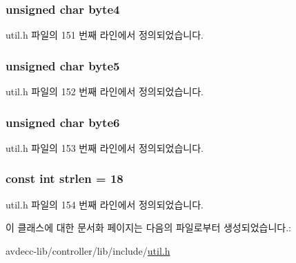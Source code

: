 \subsubsection[{\texorpdfstring{byte4}{byte4}}]{\setlength{\rightskip}{0pt plus 5cm}unsigned char byte4}\hypertarget{classavdecc__lib_1_1utility_1_1_mac_addr_a3504163365168f3068a2e1b24046a092}{}\label{classavdecc__lib_1_1utility_1_1_mac_addr_a3504163365168f3068a2e1b24046a092}


util.\+h 파일의 151 번째 라인에서 정의되었습니다.

\subsubsection[{\texorpdfstring{byte5}{byte5}}]{\setlength{\rightskip}{0pt plus 5cm}unsigned char byte5}\hypertarget{classavdecc__lib_1_1utility_1_1_mac_addr_aef954e72df4ca73d389e3758de6fe4d4}{}\label{classavdecc__lib_1_1utility_1_1_mac_addr_aef954e72df4ca73d389e3758de6fe4d4}


util.\+h 파일의 152 번째 라인에서 정의되었습니다.

\subsubsection[{\texorpdfstring{byte6}{byte6}}]{\setlength{\rightskip}{0pt plus 5cm}unsigned char byte6}\hypertarget{classavdecc__lib_1_1utility_1_1_mac_addr_a7d7a4667cf60a38b8282da8a27346f54}{}\label{classavdecc__lib_1_1utility_1_1_mac_addr_a7d7a4667cf60a38b8282da8a27346f54}


util.\+h 파일의 153 번째 라인에서 정의되었습니다.

\subsubsection[{\texorpdfstring{strlen}{strlen}}]{\setlength{\rightskip}{0pt plus 5cm}const int strlen = 18\hspace{0.3cm}{\ttfamily [static]}}\hypertarget{classavdecc__lib_1_1utility_1_1_mac_addr_ac15b51e8be042e8e8d1cbc7077cf411b}{}\label{classavdecc__lib_1_1utility_1_1_mac_addr_ac15b51e8be042e8e8d1cbc7077cf411b}


util.\+h 파일의 154 번째 라인에서 정의되었습니다.



이 클래스에 대한 문서화 페이지는 다음의 파일로부터 생성되었습니다.\+:\begin{DoxyCompactItemize}
\item 
avdecc-\/lib/controller/lib/include/\hyperlink{avdecc-lib_2controller_2lib_2include_2util_8h}{util.\+h}\end{DoxyCompactItemize}
